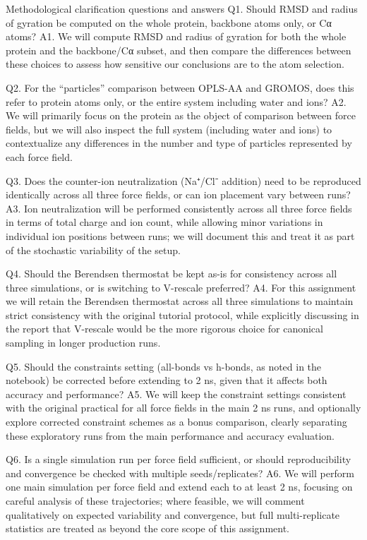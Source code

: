 Methodological clarification questions and answers
Q1. Should RMSD and radius of gyration be computed on the whole protein, backbone atoms only, or Cα atoms?
A1. We will compute RMSD and radius of gyration for both the whole protein and the backbone/Cα subset, and then compare the differences between these choices to assess how sensitive our conclusions are to the atom selection.

Q2. For the “particles” comparison between OPLS-AA and GROMOS, does this refer to protein atoms only, or the entire system including water and ions?
A2. We will primarily focus on the protein as the object of comparison between force fields, but we will also inspect the full system (including water and ions) to contextualize any differences in the number and type of particles represented by each force field.

Q3. Does the counter-ion neutralization (Na⁺/Cl⁻ addition) need to be reproduced identically across all three force fields, or can ion placement vary between runs?
A3. Ion neutralization will be performed consistently across all three force fields in terms of total charge and ion count, while allowing minor variations in individual ion positions between runs; we will document this and treat it as part of the stochastic variability of the setup.

Q4. Should the Berendsen thermostat be kept as-is for consistency across all three simulations, or is switching to V-rescale preferred?
A4. For this assignment we will retain the Berendsen thermostat across all three simulations to maintain strict consistency with the original tutorial protocol, while explicitly discussing in the report that V-rescale would be the more rigorous choice for canonical sampling in longer production runs.

Q5. Should the constraints setting (all-bonds vs h-bonds, as noted in the notebook) be corrected before extending to 2 ns, given that it affects both accuracy and performance?
A5. We will keep the constraint settings consistent with the original practical for all force fields in the main 2 ns runs, and optionally explore corrected constraint schemes as a bonus comparison, clearly separating these exploratory runs from the main performance and accuracy evaluation.

Q6. Is a single simulation run per force field sufficient, or should reproducibility and convergence be checked with multiple seeds/replicates?
A6. We will perform one main simulation per force field and extend each to at least 2 ns, focusing on careful analysis of these trajectories; where feasible, we will comment qualitatively on expected variability and convergence, but full multi-replicate statistics are treated as beyond the core scope of this assignment.

